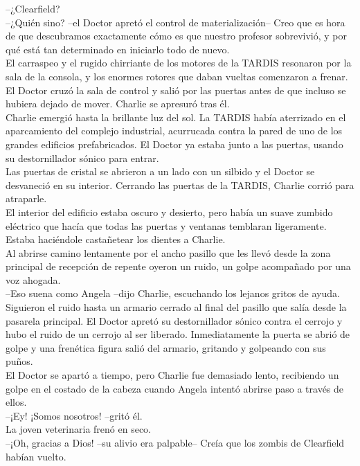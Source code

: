 --¿Clearfield?\\
--¿Quién sino? --el Doctor apretó el control de materialización-- Creo
que es hora de que descubramos exactamente cómo es que nuestro profesor
sobrevivió, y por qué está tan determinado en iniciarlo todo de nuevo.\\
El carraspeo y el rugido chirriante de los motores de la TARDIS
resonaron por la sala de la consola, y los enormes rotores que daban
vueltas comenzaron a frenar. El Doctor cruzó la sala de control y salió
por las puertas antes de que incluso se hubiera dejado de mover. Charlie
se apresuró tras él.\\
Charlie emergió hasta la brillante luz del sol. La TARDIS había
aterrizado en el aparcamiento del complejo industrial, acurrucada contra
la pared de uno de los grandes edificios prefabricados. El Doctor ya
estaba junto a las puertas, usando su destornillador sónico para
entrar.\\
Las puertas de cristal se abrieron a un lado con un silbido y el Doctor
se desvaneció en su interior. Cerrando las puertas de la TARDIS, Charlie
corrió para atraparle.\\
El interior del edificio estaba oscuro y desierto, pero había un suave
zumbido eléctrico que hacía que todas las puertas y ventanas temblaran
ligeramente. Estaba haciéndole castañetear los dientes a Charlie.\\
Al abrirse camino lentamente por el ancho pasillo que les llevó desde la
zona principal de recepción de repente oyeron un ruido, un golpe
acompañado por una voz ahogada.\\
--Eso suena como Angela --dijo Charlie, escuchando los lejanos gritos de
ayuda.\\
Siguieron el ruido hasta un armario cerrado al final del pasillo que
salía desde la pasarela principal. El Doctor apretó su destornillador
sónico contra el cerrojo y hubo el ruido de un cerrojo al ser liberado.
Inmediatamente la puerta se abrió de golpe y una frenética figura salió
del armario, gritando y golpeando con sus puños.\\
El Doctor se apartó a tiempo, pero Charlie fue demasiado lento,
recibiendo un golpe en el costado de la cabeza cuando Angela intentó
abrirse paso a través de ellos.\\
--¡Ey! ¡Somos nosotros! --gritó él.\\
La joven veterinaria frenó en seco.\\
--¡Oh, gracias a Dios! --su alivio era palpable-- Creía que los zombis
de Clearfield habían vuelto.\\
